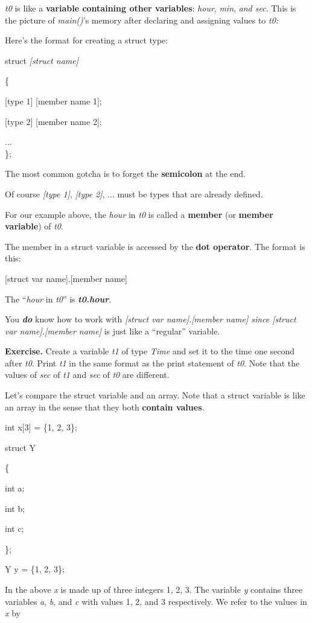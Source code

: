 \documentclass[
]{article}
\begin{document}
\emph{t0} is like a \textbf{variable containing other variables}:
\emph{hour}, \emph{min}, \emph{and sec}. This is the picture of
\emph{main()}'s memory after declaring and assigning values to
\emph{t0:}

Here's the format for creating a struct type:

struct \emph{{[}struct name{]}}

\{

{[}type 1{]} {[}member name 1{]};

{[}type 2{]} {[}member name 2{]};

...\\
\};

The most common gotcha is to forget the \textbf{semicolon} at the end.

Of course \emph{{[}type 1{]}}, \emph{{[}type 2{]}}, ... must be types
that are already defined.

For our example above, the \emph{hour} in \emph{t0} is called a
\textbf{member} (or \textbf{member variable}) of \emph{t0}.

The member in a struct variable is accessed by the \textbf{dot
operator}. The format is this:

{[}struct var name{]}.{[}member name{]}

The ``\emph{hour} in \emph{t0}'' is \emph{\textbf{t0.hour}}.

You \emph{\textbf{do}} know how to work with \emph{{[}struct var
name{]}.{[}member name{]} since {[}struct var name{]}.{[}member name{]}}
is just like a ``regular'' variable.

\textbf{Exercise.} Create a variable \emph{t1} of type \emph{Time} and
set it to the time one second after \emph{t0}. Print \emph{t1} in the
same format as the print statement of \emph{t0}. Note that the values of
\emph{sec} of \emph{t1} and \emph{sec} of \emph{t0} are different.

Let's compare the struct variable and an array. Note that a struct
variable is like an array in the sense that they both \textbf{contain
values}.

int x{[}3{]} = \{1, 2, 3\};

struct Y

\{

int a;

int b;

int c;

\};

Y y = \{1, 2, 3\};

In the above \emph{x} is made up of three integers 1, 2, 3. The variable
\emph{y} contains three variables \emph{a}, \emph{b}, and \emph{c} with
values 1, 2, and 3 respectively. We refer to the values in \emph{x} by
\end{document}
